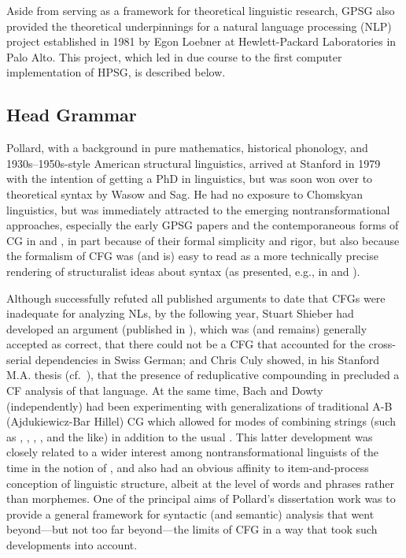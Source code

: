 \documentclass[output=paper
 	        ,biblatex
                ,babelshorthands
                ,newtxmath
                ,draftmode
                ,colorlinks, citecolor=brown
]{langscibook}
\begin{document}
Aside from serving as a framework for theoretical linguistic research, GPSG also provided the theoretical underpinnings for a natural language processing (NLP) project established in 1981 by Egon Loebner at Hewlett-Packard Laboratories in Palo Alto. This project, which led in due course to the first computer implementation of HPSG, is described below.

\subsection{Head Grammar}

Pollard, with a background in pure mathematics,  historical phonology, and
1930s--1950s-style American structural linguistics, arrived at Stanford in 1979 with the intention
of getting a PhD in  linguistics, but was soon won over to theoretical syntax by
Wasow and Sag. He had no exposure to Chomskyan linguistics, but was immediately attracted to the
emerging nontransformational approaches, especially the early GPSG papers and the contemporaneous
forms of CG in \citet{Bach79a,Bach80a} and \citeauthor{Dowty82a-u} \citeyearpar{Dowty82a-u,Dowty82b}, in part because of their formal simplicity and rigor, but also because the formalism of CFG was (and is) easy to read as a more technically precise rendering of structuralist ideas about syntax (as presented, e.g., in \citealt{Bloomfield33a-u} and \citealt{Hockett1958}).

Although \citet{PG82a-u} successfully refuted all published arguments to date that CFGs were inadequate for analyzing NLs, by the following year, Stuart Shieber had developed an argument (published in \citealt{Shieber85a}), which was (and remains) generally accepted as correct, that there could not be a CFG that accounted for the cross-serial dependencies in Swiss German; and Chris Culy showed, in his Stanford M.A. thesis (cf.\ \citealt{Culy85a}), that the presence of reduplicative compounding in  precluded a CF analysis of that language. At the same time, Bach and Dowty (independently) had been experimenting with generalizations of traditional A-B (Ajdukiewicz-Bar Hillel) CG which allowed for modes of combining strings (such as , , , , and the like) in addition to the usual . This latter development was closely related to a wider interest among nontransformational linguists of the time in the notion of , and also had an obvious affinity to  item-and-process conception of linguistic structure, albeit at the level of words and phrases rather than morphemes. One of the principal aims of Pollard's dissertation work was to provide a general framework for syntactic (and semantic) analysis that went beyond---but not too far beyond---the limits of CFG in a way that took such developments into account. 
\end{document}

